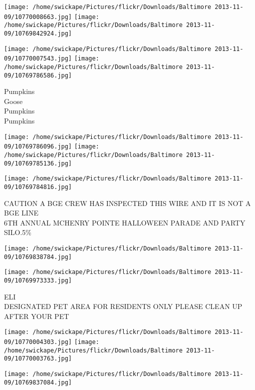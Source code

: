 \documentclass[10pt,letterpaper]{article}
\begin{document}
\texttt{[image: /home/swickape/Pictures/flickr/Downloads/Baltimore 2013-11-09/10770008663.jpg]}
\texttt{[image: /home/swickape/Pictures/flickr/Downloads/Baltimore 2013-11-09/10769842924.jpg]}

\texttt{[image: /home/swickape/Pictures/flickr/Downloads/Baltimore 2013-11-09/10770007543.jpg]}
\texttt{[image: /home/swickape/Pictures/flickr/Downloads/Baltimore 2013-11-09/10769786586.jpg]}

Pumpkins\\
Goose\\
Pumpkins\\
Pumpkins\\
\pagebreak

\texttt{[image: /home/swickape/Pictures/flickr/Downloads/Baltimore 2013-11-09/10769786096.jpg]}
\texttt{[image: /home/swickape/Pictures/flickr/Downloads/Baltimore 2013-11-09/10769785136.jpg]}

\vspace{0.25in}
\texttt{[image: /home/swickape/Pictures/flickr/Downloads/Baltimore 2013-11-09/10769784816.jpg]}

CAUTION A BGE CREW HAS INSPECTED THIS WIRE AND IT IS NOT A BGE LINE\\
6TH ANNUAL MCHENRY POINTE HALLOWEEN PARADE AND PARTY\\
SILO.5\%\\
\pagebreak

\texttt{[image: /home/swickape/Pictures/flickr/Downloads/Baltimore 2013-11-09/10769838784.jpg]}

\vspace{0.25in}
\texttt{[image: /home/swickape/Pictures/flickr/Downloads/Baltimore 2013-11-09/10769973333.jpg]}

ELI\\
DESIGNATED PET AREA FOR RESIDENTS ONLY PLEASE CLEAN UP AFTER YOUR PET\\
\pagebreak

\texttt{[image: /home/swickape/Pictures/flickr/Downloads/Baltimore 2013-11-09/10770004303.jpg]}
\texttt{[image: /home/swickape/Pictures/flickr/Downloads/Baltimore 2013-11-09/10770003763.jpg]}

\vspace{0.25in}
\texttt{[image: /home/swickape/Pictures/flickr/Downloads/Baltimore 2013-11-09/10769837084.jpg]}
\end{document}

